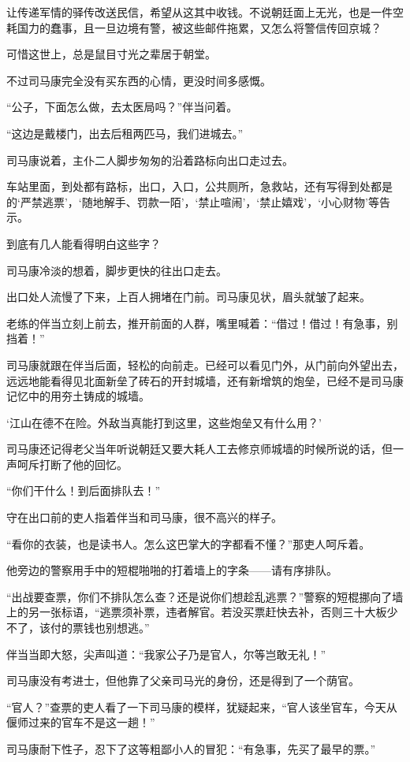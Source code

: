 让传递军情的驿传改送民信，希望从这其中收钱。不说朝廷面上无光，也是一件空耗国力的蠢事，且一旦边境有警，被这些邮件拖累，又怎么将警信传回京城？

可惜这世上，总是鼠目寸光之辈居于朝堂。

不过司马康完全没有买东西的心情，更没时间多感慨。

“公子，下面怎么做，去太医局吗？”伴当问着。

“这边是戴楼门，出去后租两匹马，我们进城去。”

司马康说着，主仆二人脚步匆匆的沿着路标向出口走过去。

车站里面，到处都有路标，出口，入口，公共厕所，急救站，还有写得到处都是的‘严禁逃票’，‘随地解手、罚款一陌’，‘禁止喧闹’，‘禁止嬉戏’，‘小心财物’等告示。

到底有几人能看得明白这些字？

司马康冷淡的想着，脚步更快的往出口走去。

出口处人流慢了下来，上百人拥堵在门前。司马康见状，眉头就皱了起来。

老练的伴当立刻上前去，推开前面的人群，嘴里喊着：“借过！借过！有急事，别挡着！”

司马康就跟在伴当后面，轻松的向前走。已经可以看见门外，从门前向外望出去，远远地能看得见北面新垒了砖石的开封城墙，还有新增筑的炮垒，已经不是司马康记忆中的用夯土铸成的城墙。

‘江山在德不在险。外敌当真能打到这里，这些炮垒又有什么用？’

司马康还记得老父当年听说朝廷又要大耗人工去修京师城墙的时候所说的话，但一声呵斥打断了他的回忆。

“你们干什么！到后面排队去！”

守在出口前的吏人指着伴当和司马康，很不高兴的样子。

“看你的衣装，也是读书人。怎么这巴掌大的字都看不懂？”那吏人呵斥着。

他旁边的警察用手中的短棍啪啪的打着墙上的字条——请有序排队。

“出战要查票，你们不排队怎么查？还是说你们想趁乱逃票？”警察的短棍挪向了墙上的另一张标语，“逃票须补票，违者解官。若没买票赶快去补，否则三十大板少不了，该付的票钱也别想逃。”

伴当当即大怒，尖声叫道：“我家公子乃是官人，尔等岂敢无礼！”

司马康没有考进士，但他靠了父亲司马光的身份，还是得到了一个荫官。

“官人？”查票的吏人看了一下司马康的模样，犹疑起来，“官人该坐官车，今天从偃师过来的官车不是这一趟！”

司马康耐下性子，忍下了这等粗鄙小人的冒犯：“有急事，先买了最早的票。”

